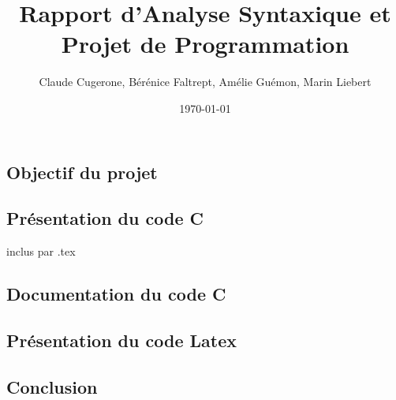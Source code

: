 \documentclass[10pt,a4paper]{report}
\begin{document}
\title{Rapport d'Analyse Syntaxique et Projet de Programmation}

\date{\today}

\author{Claude Cugerone, Bérénice Faltrept, Amélie Guémon, Marin Liebert}

\textcolor{colortitre1}{\section*{Objectif du projet}}

\textcolor{colortitre1}{\section*{Présentation du code C}}
 inclus par \jobname .tex
\textcolor{colortitre1}{\section*{Documentation du code C}}

\textcolor{colortitre1}{\section*{Présentation du code Latex}}

\textcolor{colortitre1}{\section*{Conclusion}}
\end{document}
